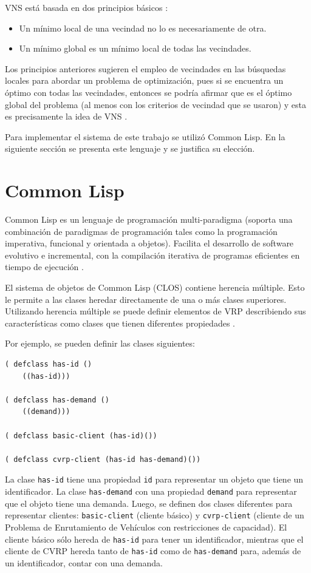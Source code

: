 VNS está basada en dos principios básicos \cite{Camila}:
\begin{itemize}
	\item Un mínimo local de una vecindad no lo es necesariamente de otra.
	\item Un mínimo global es un mínimo local de todas las vecindades.
\end{itemize}

Los principios anteriores sugieren el empleo de vecindades en las búsquedas locales para abordar un problema de optimización, pues si se encuentra un óptimo con todas las vecindades, entonces se podría afirmar que es el óptimo global del problema (al menos con los criterios de vecindad que se usaron) y esta es precisamente la idea de VNS \cite{Camila}.

Para implementar el sistema de este trabajo se utilizó Common Lisp. En la siguiente sección se presenta este lenguaje y se justifica su elección.

\section{Common Lisp}\label{1-Lisp}
Common Lisp es un lenguaje de programación multi-paradigma (soporta una combinación de paradigmas de programación tales como la programación imperativa, funcional y orientada a objetos). Facilita el desarrollo de software evolutivo e incremental, con la compilación iterativa de programas eficientes en tiempo de ejecución \cite{Lisp1990}.


El sistema de objetos de Common Lisp (CLOS) contiene herencia múltiple. Esto le permite a las clases heredar directamente de una o más clases superiores. Utilizando herencia múltiple se puede definir elementos de VRP describiendo sus características como clases que tienen diferentes propiedades \cite{Lisp2006}.

Por ejemplo, se pueden definir las clases siguientes:

\begin{lstlisting}
( defclass has-id ()
	((has-id)))

( defclass has-demand ()
	((demand)))

( defclass basic-client (has-id)())

( defclass cvrp-client (has-id has-demand)())
\end{lstlisting}

La clase \texttt{has-id} tiene una propiedad \texttt{id} para representar un objeto que tiene un identificador. La clase \texttt{has-demand} con una propiedad \texttt{demand} para representar que el objeto tiene una demanda. Luego, se definen dos clases diferentes para representar clientes: \texttt{basic-client} (cliente básico) y \texttt{cvrp-client} (cliente de un Problema de Enrutamiento de Vehículos con restricciones de capacidad). El cliente básico sólo hereda de \texttt{has-id} para tener un identificador, mientras que el cliente de CVRP hereda tanto de \texttt{has-id} como de \texttt{has-demand} para, además de un identificador, contar con una demanda.

